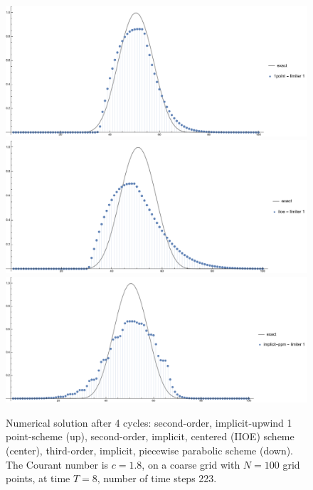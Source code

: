 \documentclass[../thesis.tex]{subfiles}
\begin{document}
\begin{figure}[H]
	\centering
	\includegraphics[width=\textwidth]{fig-1point-c1p8-T8-limit1-smooth.pdf}
	\includegraphics[width=\textwidth]{fig-iioe-c1p8-T8-limit1-smooth.pdf}
	\includegraphics[width=\textwidth]{fig-implicit-ppm-c1p8-T8-limit1-smooth.pdf}
	\caption{Numerical solution after 4 cycles: second-order, implicit-upwind 1 point-scheme (up), second-order, implicit, centered (IIOE) scheme (center), third-order, implicit, piecewise parabolic scheme (down). The Courant number is \(c = 1.8\), on a coarse grid with \(N = 100\) grid points, at time \(T = 8\), number of time steps 223.}
	\label{fig:c1p8-T8-limit1-smooth}
\end{figure}
\end{document}
